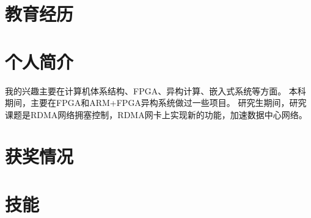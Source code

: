 \documentclass[11pt,a4paper]{moderncv}
\begin{document}
	
	\renewcommand{\refname}{Publikationen}
	\maketitle
	
	\section{教育经历}
	\section{个人简介}
	\cvline{}
	{
		我的兴趣主要在计算机体系结构、FPGA、异构计算、嵌入式系统等方面。
		\newline
		本科期间，主要在FPGA和ARM+FPGA异构系统做过一些项目。
		\newline
		研究生期间，研究课题是RDMA网络拥塞控制，RDMA网卡上实现新的功能，加速数据中心网络。
	}
	
	\section{获奖情况}
	
	\section{技能}
	
\end{document}
